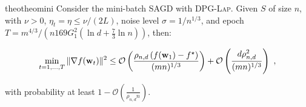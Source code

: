 \documentclass[11pt]{article}
\begin{document}

\begin{restatable}{theo}{theomini}
\label{thm: main_rmsprop_mini}
Consider the mini-batch \textsc{SAGD} with \textsc{DPG-Lap}. 
Given $S$ of size $n$, with $\nu >0$, $\eta_t = \eta \leq \nu/(2L)$, noise level $\sigma = 1/n^{1/3}$, and epoch $T = m^{4/3}/\left(n169G_1^2(\ln d + \frac{7}{3}\ln n)\right)$, then:
 \begin{small}
\begin{equation*}
\begin{split}
 \min_{t = 1,..., T}\|\nabla f(\mathbf{w}_t)\|^2 
 \leq\mathcal{O} \left( \frac{\rho_{n,d} \left(f(\mathbf{w}_1) - f^\star \right)}{(mn)^{1/3}} \right)+\mathcal{O} \left( \frac{d \rho_{n,d}^2}{(mn)^{1/3}}\right)~,
 \end{split}
\end{equation*}
\end{small}
with probability at least $1-\mathcal{O} \left(\frac{1}{\rho_{n,d} n}\right)$.
\end{restatable}
\end{document}
